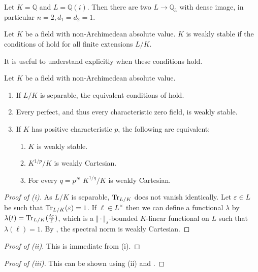 \begin{example}
Let $K=\mathbb{Q}$ and $L=\mathbb{Q}(i)$. Then there are two
$L\to \mathbb{Q}_5$ with dense image, in particular $n=2, d_1=d_2=1$.
\end{example}
\begin{definition}
    Let $K$ be a field with non-Archimedean absolute value. $K$ is weakly stable if the conditions of  hold for all finite extensions $L/K$. 
\end{definition}
It is useful to understand explicitly when these conditions hold. 
\begin{proposition}\label{prop: when things are weakly stable}
    Let $K$ be a field with non-Archimedean absolute value. 
    \begin{enumerate}[label=(\roman*)]
        \item If $L/K$ is separable, the equivalent conditions of  hold. 
        \item Every perfect, and thus every characteristic zero field, is weakly stable. 
        \item If $K$ has positive characteristic $p$, the following are equivalent: 
        \begin{enumerate}[label=(\alph*)]
            \item $K$ is weakly stable. 
            \item $K^{1/p}/K$ is weakly Cartesian. 
            \item For every $q=p^{N}$ $K^{1/q}/K$ is weakly Cartesian. 
        \end{enumerate}
    \end{enumerate}
\end{proposition}
\begin{proof}[Proof of (i)]
    As $L/K$ is separable, $\mathrm{Tr}_{L/K}$ does not vanish identically. Let $\varepsilon\in L$ be such that $\mathrm{Tr}_{L/K}(\varepsilon)=1$. If $\ell\in L^{\times}$ then we can define a functional $\lambda$ by $\lambda(t)=\mathrm{Tr}_{L/K}(\frac{t\varepsilon}{\ell})$, which is a $\Vert\cdot\Vert_{s}$-bounded $K$-linear functional on $L$ such that $\lambda(\ell)=1$. By , the spectral norm is weakly Cartesian. 
\end{proof}
\begin{proof}[Proof of (ii)]
    This is immediate from (i). 
\end{proof}
\begin{proof}[Proof of (iii)]
    This can be shown using (ii) and . 
\end{proof}
